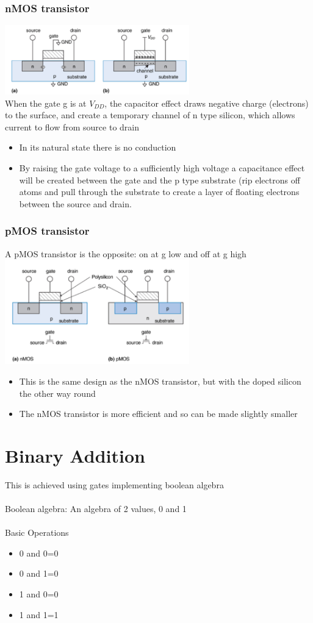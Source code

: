 \documentclass{article}[18pt]
\begin{document}
\subsubsection{nMOS transistor}
\includegraphics[width=8cm]{NMOS.png}\\
When the gate g is at $V_{DD}$, the capacitor effect draws negative charge (electrons) to the surface, and create a temporary channel of n type silicon, which allows current to flow from source to drain
\begin{itemize}
\item In its natural state there is no conduction
\item By raising the gate voltage to a sufficiently high voltage a capacitance effect will be created between the gate and the p type substrate (rip electrons off atoms and pull through the substrate to create a layer of floating electrons between the source and drain.
\end{itemize}
\subsubsection{pMOS transistor}
A pMOS transistor is the opposite: on at g low and off at g high\\
\includegraphics[width=8cm]{pMOS.png}
\begin{itemize}
\item This is the same design as the nMOS transistor, but with the doped silicon the other way round
\item The nMOS transistor is more efficient and so can be made slightly smaller
\end{itemize}
\newpage
\section{Binary Addition}
This is achieved using gates implementing boolean algebra\\
\\
Boolean algebra: An algebra of 2 values, 0 and 1\\
\\
Basic Operations
\begin{itemize}
\item 0 and 0=0
\item 0 and 1=0
\item 1 and 0=0
\item 1 and 1=1
\end{itemize}
\end{document}
